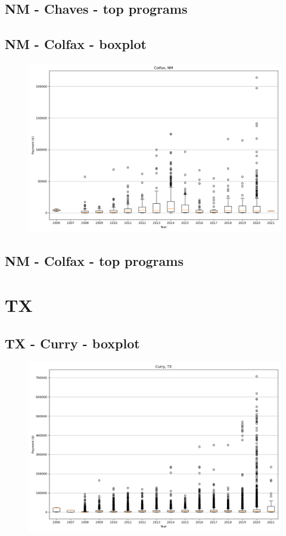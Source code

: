 \subsection*{NM - Chaves - top programs}

\newpage
\subsection*{NM - Colfax - boxplot}
\begin{figure}[h]
\centering
\includegraphics[width=7in]{../output/boxplots/counties/Colfax-NM_boxplot.png}
\end{figure}


\subsection*{NM - Colfax - top programs}

\newpage
\section*{TX}
\subsection*{TX - Curry - boxplot}
\begin{figure}[h]
\centering
\includegraphics[width=7in]{../output/boxplots/counties/Curry-TX_boxplot.png}
\end{figure}


